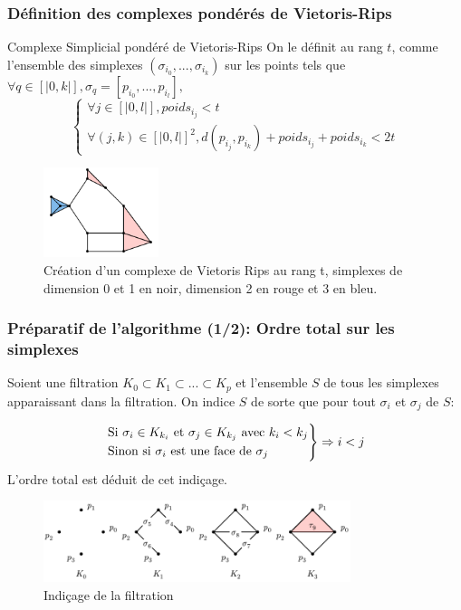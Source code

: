 \documentclass{beamer}
\begin{document}
\begin{frame}
    \frametitle{Définition des complexes pondérés de Vietoris-Rips}
    \begin{block}{Complexe Simplicial pondéré de Vietoris-Rips}
        On le définit au rang $t$, comme l'ensemble des simplexes $(\sigma_{i_0}, ..., \sigma_{i_k})$ sur les points tels que $\forall q \in [|0, k|], \sigma_q = [p_{i_0}, ...,p_{i_l}],$ 
        $$
            \begin{cases}
                \forall j \in [|0, l|], poids_{i_j} < t\\
                \forall (j,k) \in [|0, l|]^2, d(p_{i_j}, p_{i_k}) + poids_{i_j} + poids_{i_k} < 2t
            \end{cases}
        $$
    \end{block}

    \begin{figure}
        \centering
        \includegraphics[width=0.3\textwidth]{../images/filtrationVR.png}
        \caption{Création d'un complexe de Vietoris Rips au rang t, simplexes de dimension 0 et 1 en noir, dimension 2 en rouge et 3 en bleu.}
    \end{figure}
    
\end{frame}

\begin{frame}
    \frametitle{Préparatif de l'algorithme (1/2): Ordre total sur les simplexes}
    Soient une filtration $K_0 \subset K_1 \subset ... \subset K_p$ et l'ensemble $S$ de tous les simplexes apparaissant dans la filtration. On indice $S$ de sorte que pour tout $\sigma_i$ et $\sigma_j$ de $S$: 

    $$ 
    \begin{rcases}
        \text{Si } \sigma_i \in K_{k_i} \text{ et } \sigma_j \in K_{k_j} \text{ avec } k_i < k_j\\
        \text{Sinon si } \sigma_i \text{ est une face de } \sigma_j
    \end{rcases}\Rightarrow i < j 
    $$
    L'ordre total est déduit de cet indiçage.
    \begin{figure}
        \centering
        \includegraphics[width=0.8\textwidth]{../images/filtration_horizontal.png}
        \caption{Indiçage de la filtration}
    \end{figure}
\end{frame}
\end{document}
